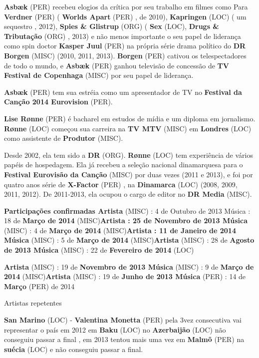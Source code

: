 \documentclass[12pt,a4paper]{article}
\begin{document}
\textbf{Asbæk} (PER) recebeu elogios da crítica por seu trabalho em filmes como Para \textbf{Verdner} (PER) ( \textbf{Worlds Apart} (PER) , de 2010), \textbf{Kapringen} (LOC) ( um sequestro , 2012), \textbf{Spies \& Glistrup} (ORG) ( \textbf{Sex} (LOC), \textbf{Drugs \& Tributação} (ORG) , 2013) e não menos importante o seu papel de liderança como spin doctor \textbf{Kasper Juul} (PER) na própria série drama político do \textbf{DR Borgen} (MISC) (2010, 2011, 2013). \textbf{Borgen} (PER) cativou os telespectadores de todo o mundo, e \textbf{Asbæk} (PER) ganhou televisão de concessão de \textbf{TV Festival de Copenhaga} (MISC) por seu papel de liderança.

\textbf{Asbæk} (PER) tem sua estréia como um apresentador de TV no \textbf{Festival da Canção 2014 Eurovision} (PER).

\textbf{Lise Rønne} (PER) é bacharel em estudos de mídia e um diploma em jornalismo. \textbf{Rønne} (LOC) começou sua carreira na \textbf{TV MTV} (MISC) em \textbf{Londres} (LOC) como assistente de \textbf{Produtor} (MISC).

Desde 2002, ela tem sido a \textbf{DR} (ORG). \textbf{Rønne} (LOC) tem experiência de vários papéis de hospedagem. Ela já recebeu a seleção nacional dinamarquesa para o \textbf{Festival Eurovisão da Canção} (MISC) por duas vezes (2011 e 2013), e foi por quatro anos série de \textbf{X-Factor} (PER) , na \textbf{Dinamarca} (LOC) (2008, 2009, 2011, 2012). De 2011-2013, ela ocupou o cargo de editor no \textbf{DR Media} (MISC).



\textbf{Participações confirmadas Artista} (MISC) : 4 de Outubro de 2013 Música : 18 de \textbf{Março de 2014} (MISC)\textbf{Artista : 25 de Novembro de 2013 Música} (MISC) : 4 de \textbf{Março de 2014} (MISC)\textbf{Artista : 11 de Janeiro de 2014 Música} (MISC) : 5 de \textbf{Março de 2014} (MISC)\textbf{Artista} (MISC) : 28 de \textbf{Agosto de 2013 Música} (MISC) : 22 de \textbf{Fevereiro de 2014} (LOC)

\textbf{Artista} (MISC) : 19 de \textbf{Novembro de 2013 Música} (MISC) : 9 de \textbf{Março de 2014} (MISC)\textbf{Artista} (MISC) : 19 de \textbf{Junho de 2013 Música} (PER) : 14 de \textbf{Março} (PER) de 2014



Artistas repetentes

\textbf{San Marino} (LOC) - \textbf{Valentina Monetta} (PER) pela 3vez consecutiva vai representar o país em 2012 em \textbf{Baku} (LOC) no \textbf{Azerbaijão} (LOC) não conseguiu passar a final , em 2013 tentou mais uma vez em \textbf{Malmõ} (PER) na \textbf{suécia} (LOC) e não conseguiu passar a final.
\end{document}
